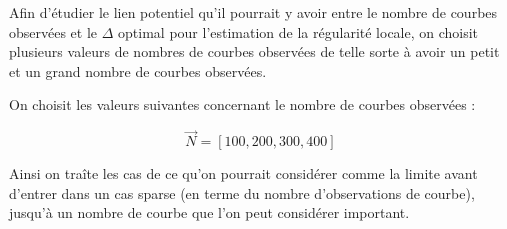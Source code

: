Afin d'étudier le lien potentiel qu'il pourrait y avoir entre le nombre de courbes observées et le $\Delta$ optimal pour l'estimation de la régularité locale, on choisit plusieurs valeurs de nombres de courbes observées de telle sorte à avoir un \og petit \fg et un \og grand \fg nombre de courbes observées.

On choisit les valeurs suivantes concernant le nombre de courbes observées :

\begin{equation*}
	\vec N = [ 100, 200, 300, 400]
\end{equation*}

Ainsi on traîte les cas de ce qu'on pourrait considérer comme la limite avant d'entrer dans un cas \og sparse \fg (en terme du nombre d'observations de courbe), jusqu'à un nombre de courbe que l'on peut considérer important.